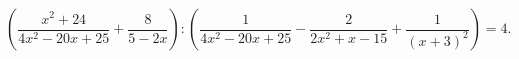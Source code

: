 \begin{ex}[type=equation]
	\begin{condition}
		$\left(\dfrac{x^2 + 24}{4x^2 - 20x + 25}+ \dfrac{8}{5 - 2x}\right) :\left(\dfrac{1}{4x^2 - 20x + 25} - \dfrac{2}{2x^2 + x-15} + \dfrac{1}{(x + 3)^2}\right) = 4.$
	\end{condition}
\end{ex}